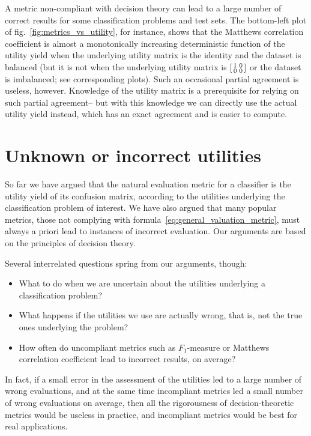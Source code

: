 \documentclass[\ifafour a4paper,12pt,\else a5paper,10pt,\fi%
onecolumn,oneside,article,%
british%
]{memoir}
\theoremstyle{remark}
\theoremstyle{innote}
\renewcommand*{\|}[1][]{\nonscript\:#1\vert\nonscript\:\mathopen{}}
\newcommand*{\fig}{fig.}%
\begin{document}
\medskip

A metric non-compliant with decision theory can lead to a large number of correct results for some classification problems and test sets. The bottom-left plot of \fig~\ref{fig:metrics_vs_utility}, for instance, shows that the Matthews correlation coefficient is almost a monotonically increasing deterministic function of the utility yield when the underlying utility matrix is the identity and the dataset is balanced (but it is not when the underlying utility matrix is $\begin{bsmallmatrix} 1&0\\0&0 \end{bsmallmatrix}$ or the dataset is imbalanced; see corresponding plots). Such an occasional partial agreement is useless, however. Knowledge of the utility matrix is a prerequisite for relying on such partial agreement-- but with this knowledge we can directly use the actual utility yield instead, which has an exact agreement and is easier to compute.


\section{Unknown or incorrect utilities}
\label{sec:unknown_wrong_utilities}

So far we have argued that the natural evaluation metric for a classifier is the utility yield of its confusion matrix, according to the utilities underlying the classification problem of interest. We have also argued that many popular metrics, those not complying with formula~\eqref{eq:general_valuation_metric}, must always a priori lead to instances of incorrect evaluation. Our arguments are based on the principles of decision theory.

Several interrelated questions spring from our arguments, though:
\begin{itemize}
\item What to do when we are uncertain about the utilities underlying a classification problem?
\item What happens if the utilities we use are actually wrong, that is, not the true ones underlying the problem?
\item How often do uncompliant metrics such as $F_{1}$-measure or Matthews correlation coefficient lead to incorrect results, on average?
\end{itemize}
In fact, if a small error in the assessment of the utilities led to a large number of wrong evaluations, and at the same time incompliant metrics led a small number of wrong evaluations on average, then all the rigorousness of decision-theoretic metrics would be useless in practice, and  incompliant metrics would be best for real applications.
\end{document}
